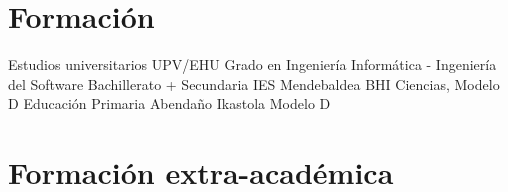 \documentclass[letterpaper]{twentysecondcv} %
\begin{document}

\section{Formación}

\begin{twenty} %
	{Estudios universitarios}
	{UPV/EHU}
	{Grado en Ingeniería Informática - Ingeniería del Software}
	{Bachillerato + Secundaria}
	{IES Mendebaldea BHI}
	{Ciencias, Modelo D}
	{Educación Primaria}
	{Abenda\~no Ikastola}
	{Modelo D}
\end{twenty}


\section{Formación extra-académica}

\begin{twentyshort} %

\end{twentyshort}

\end{document}
